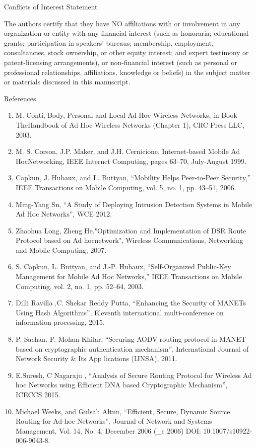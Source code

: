 \documentclass[10pt]{NSP1}
\begin{document}
Conflicts of Interest Statement

The authors certify that they have NO affiliations with or involvement in any organization or entity with any financial interest (such as honoraria; educational grants; participation in speakers’ bureaus; membership, employment, consultancies, stock ownership, or other equity interest; and expert testimony or patent-licensing arrangements), or non-financial interest (such as personal or professional relationships, affiliations, knowledge or beliefs) in the subject matter or materials discussed in this manuscript.

References

\begin{enumerate}
  \item M. Conti, Body, Personal and Local Ad Hoc Wireless Networks, in Book TheHandbook of Ad Hoc Wireless Networks (Chapter 1), CRC Press LLC, 2003.
  \item M. S. Corson, J.P. Maker, and J.H. Cernicione, Internet-based Mobile Ad HocNetworking, IEEE Internet Computing, pages 63–70, July-August 1999.
  \item Capkun, J. Hubaux, and L. Buttyan, “Mobility Helps Peer-to-Peer Security,” IEEE Transactions on Mobile Computing, vol. 5, no. 1, pp. 43–51, 2006.
  \item Ming-Yang Su, “A Study of Deploying Intrusion Detection Systems in Mobile Ad Hoc Networks”, WCE 2012.
  \item Zhaohua Long, Zheng He."Optimization and Implementation of DSR Route Protocol based on Ad hocnetwork", Wireless Communications, Networking and Mobile Computing, 2007.
  \item S. Capkun, L. Buttyan, and J.-P. Hubaux, “Self-Organized Public-Key Management for Mobile Ad Hoc Networks,” IEEE Transactions on Mobile Computing, vol. 2, no. 1, pp. 52–64, 2003.
  \item Dilli Ravilla ,C. Shekar Reddy Putta, “Enhancing the Security of MANETs Using Hash Algorithms”, Eleventh international multi-conference on information processing, 2015.
  \item P. Sachan, P. Mohan Khilar, “Securing AODV routing protocol in MANET based on cryptographic authentication mechanism”, International Journal of Network Security \& Its App lications (IJNSA), 2011.
  \item E.Suresh, C Nagaraju , “Analysis of Secure Routing Protocol for Wireless Ad hoc Networks using Efficient DNA based Cryptographic Mechanism”, ICECCS 2015.
  \item Michael Weeks, and Gulsah Altun, “Efficient, Secure, Dynamic Source Routing for Ad-hoc Networks”, Journal of Network and Systems Management, Vol. 14, No. 4, December 2006 (\_c 2006) DOI: 10.1007/s10922-006-9043-8.

\end{enumerate}
\end{document}
